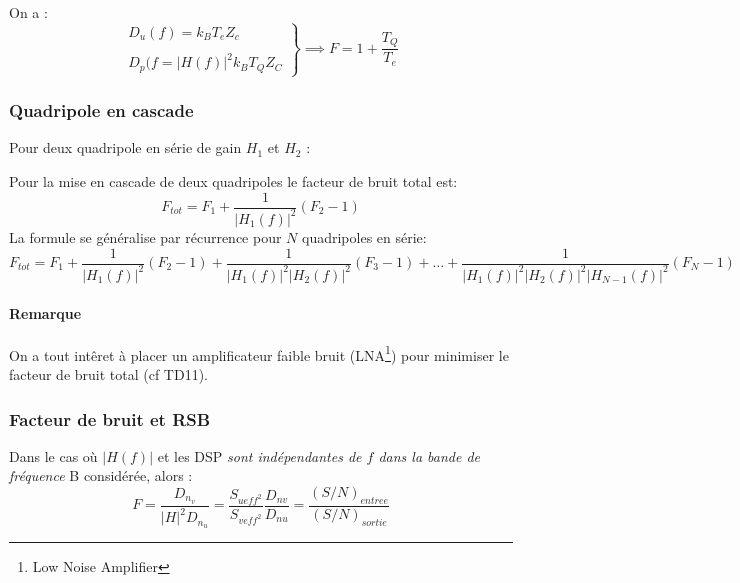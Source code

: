 \documentclass[main.tex]{subfiles}
\begin{document}
   \begin{prop}
     On a :
     \[\left.
       \begin{array}{r}
         D_u(f) = k_B T_eZ_c \\
         ~\\
         D_p(f  = |H(f)|^2k_BT_QZ_C
       \end{array}\right\} \implies F = 1 + \frac{T_Q}{T_e}
     \]
   \end{prop}

\subsubsection{Quadripole en cascade}
   Pour deux quadripole en série de gain $H_1$ et $H_2$ :

{\LARGE
\begin{center}
\end{center}}


\begin{thm}
  Pour la mise en cascade de deux quadripoles le facteur de bruit total est:
  \[
    F_{tot} = F_1 + \frac{1}{|H_1(f)|^2}(F_2-1)
  \]
  La formule se généralise par récurrence pour $N$ quadripoles en série:
  \[
    F_{tot} = F_1 + \frac{1}{|H_1(f)|^2}(F_2-1) + \frac{1}{|H_1(f)|^2|H_2(f)|^2}(F_3-1)+ \dots + \frac{1}{|H_1(f)|^2|H_2(f)|^2|H_{N-1}(f)|^2}(F_N-1)
  \]
\end{thm}
\paragraph{Remarque}
On a tout intêret à placer un amplificateur faible bruit (LNA\footnote{Low Noise Amplifier}) pour minimiser le facteur de bruit total (cf TD11).

\subsubsection{Facteur de bruit et RSB}
{\Large
\begin{center}
\end{center}}
\begin{prop}
  Dans le cas où $|H(f)|$ et les DSP \emph{sont indépendantes de $f$ dans la bande de fréquence} B considérée, alors :
   \[
     F = \frac{D_{n_v}}{|H|^2D_{n_u}} = \frac{S_{ueff^2}}{S_{veff^2}}\frac{D_{nv}}{D_{nu}} = \frac{(S/N)_{entree}}{(S/N)_{sortie}}
   \]
\end{prop}
\end{document}
